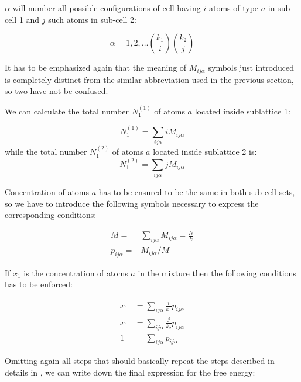 \documentclass[12pt,abstract]{scrartcl}
\begin{document}
$\alpha$ will number all possible configurations of cell having $i$ atoms of type $a$ in sub-cell 1 and $j$  such atoms in sub-cell 2:

 
\begin{equation} \label{alpha}
\alpha = 1, 2, \dots \binom{k_1}{i} \binom{k_2}{j}
\end{equation}

It has to be emphasized again that the meaning of $M_{i j \alpha}$ symbols just introduced is completely distinct from the similar abbreviation used in the previous section, so two have not be confused.

We can calculate the total number $N_1^{(1)} $ of atoms $a$ located inside sublattice 1:

\begin{equation} \label{N11}
N_1^{(1)} = \sum_{i j \alpha} i M_{i j \alpha}
\end{equation}
while the  total number $N_1^{(2)} $ of atoms $a$ located inside  sublattice 2 is:
\begin{equation} \label{N12}
N_1^{(2)} = \sum_{i j \alpha} j M_{i j \alpha}
\end{equation}

Concentration of atoms $a$ has to be ensured to be the same in both sub-cell sets, so we have to introduce the following symbols necessary to express the corresponding conditions:

\begin{equation} \label{M}
\begin{split}
M =&  \sum_{i j \alpha}  M_{i j \alpha} = \frac{N}{k}\\
 p_{i j \alpha} = &  M_{i j \alpha} / M
\end{split}
\end{equation}

If $x_1$ is the concentration of atoms $a$ in the mixture then the following conditions has to be enforced:

\begin{equation} \label{x11}
\begin{split}
x_1 & = \sum_{i j \alpha} \frac{i}{k_1} p_{i j \alpha}\\
x_1 & = \sum_{i j \alpha} \frac{j}{k_2} p_{i j \alpha}\\
1 &= \sum_{i j \alpha} p_{i j \alpha}
\end{split}
\end{equation}

Omitting again all  steps that should basically repeat the steps described in details in  \cite{TISR_p1}, we can  write down the final expression for the free energy:
\end{document}
